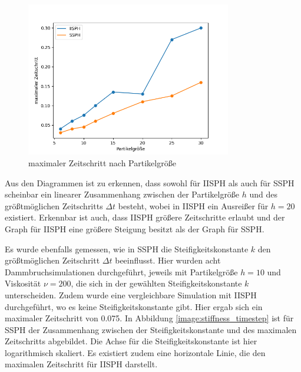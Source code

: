 \documentclass[11pt,
a4paper,
parskip=half, %
BCOR=10mm, %
english,
ngerman]{scrreprt}
\begin{document}
\begin{figure}[htb]
    \includegraphics[width=0.8\textwidth]{particle_size_timestep.png}
    \caption{maximaler Zeitschritt nach Partikelgröße}
    \label{image:particle_size_timestep}
\end{figure}
%

Aus den Diagrammen ist zu erkennen,
dass sowohl für IISPH als auch für SSPH scheinbar ein linearer Zusammenhang zwischen der Partikelgröße $h$ und des größtmöglichen Zeitschritts $\Delta t$ besteht,
wobei in IISPH ein Ausreißer für $h = 20$ existiert.
Erkennbar ist auch, dass IISPH größere Zeitschritte erlaubt und der Graph für IISPH eine größere Steigung besitzt als der Graph für SSPH.

Es wurde ebenfalls gemessen, wie in SSPH die Steifigkeitskonstante $k$ den größtmöglichen Zeitschritt $\Delta t$ beeinflusst.
Hier wurden acht Dammbruchsimulationen durchgeführt, jeweils mit Partikelgröße $h = 10$ und Viskosität $\nu = 200$,
die sich in der gewählten Steifigkeitskonstante $k$ unterscheiden.
Zudem wurde eine vergleichbare Simulation mit IISPH durchgeführt, wo es keine Steifigkeitskonstante gibt. 
Hier ergab sich ein maximaler Zeitschritt von 0.075.
In Abbildung \ref{image:stiffness_timestep} ist für SSPH der Zusammenhang zwischen der Steifigkeitskonstante und des maximalen Zeitschritts abgebildet.
Die Achse für die Steifigkeitskonstante ist hier logarithmisch skaliert.
Es existiert zudem eine horizontale Linie, die den maximalen Zeitschritt für IISPH darstellt.
\end{document}
